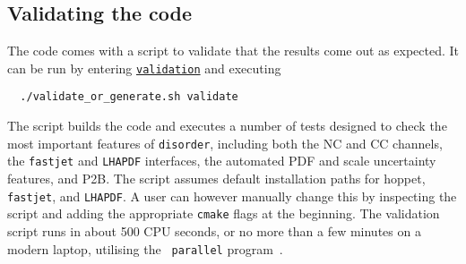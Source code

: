 \documentclass[submission, PhysCodeb]{SciPost_better_arXiv}
\newcommand{\hoppet}{{\sc hoppet}}
\newcommand{\disorder}{{\tt disorder}}
\newcommand{\fastjet}{{\tt fastjet}}
\newcommand{\lhapdf}{{\tt LHAPDF}}
\newcommand{\ttt}[1]{\texttt{#1}}
\newcommand{\repolink}[2]{\href{https://github.com/alexanderkarlberg/disorder/blob/master/#1}{\ttt{#2}}}
\newcommand{\masterlink}[1]{\repolink{#1}{#1}}
\begin{document}
\subsection{Validating the code}
The code comes with a script to validate that the results come out as expected. It can be run by entering \masterlink{validation} and executing
\begin{lstlisting}
  ./validate_or_generate.sh validate
\end{lstlisting}
The script builds the code and executes a number of tests designed to
check the most important features of \disorder{}, including both the
NC and CC channels, the \fastjet{} and \lhapdf{} interfaces, the
automated PDF and scale uncertainty features, and P2B. The script
assumes default installation paths for \hoppet{}, \fastjet{}, and
\lhapdf{}. A user can however manually change this by inspecting the
script and adding the appropriate {\tt cmake} flags at the
beginning. The validation script runs in about 500 CPU seconds, or no
more than a few minutes on a modern laptop, utilising the {\tt
  parallel} program~\cite{tange_2021_5233953}.
\end{document}
